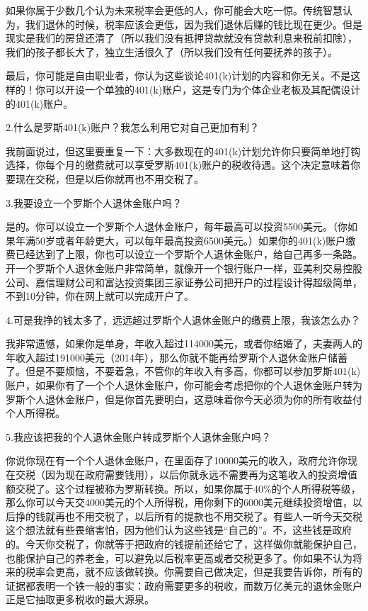 如果你属于少数几个认为未来税率会更低的人，你可能会大吃一惊。传统智慧认为，我们退休的时候，税率应该会更低，因为我们退休后赚的钱比现在更少。但是现实是我们的房贷还清了（所以我们没有抵押贷款就没有贷款利息来税前扣除），我们的孩子都长大了，独立生活很久了（所以我们没有任何要抚养的孩子）。

最后，你可能是自由职业者，你认为这些谈论401(k)计划的内容和你无关。不是这样的！你可以开设一个单独的401(k)账户，这是专门为个体企业老板及其配偶设计的401(k)账户。

2.什么是罗斯401(k)账户？我怎么利用它对自己更加有利？

我前面说过，但这里要重复一下：大多数现在的401(k)计划允许你只要简单地打钩选择，你每个月的缴费就可以享受罗斯401(k)账户的税收待遇。这个决定意味着你要现在交税，但是以后你就再也不用交税了。

3.我要设立一个罗斯个人退休金账户吗？

是的。你可以设立一个罗斯个人退休金账户，每年最高可以投资5500美元。（你如果年满50岁或者年龄更大，可以每年最高投资6500美元。）如果你的401(k)账户缴费已经达到了上限，你也可以设立一个罗斯个人退休金账户，给自己再多一条路。开一个罗斯个人退休金账户非常简单，就像开一个银行账户一样，亚美利交易控股公司、嘉信理财公司和富达投资集团三家证券公司把开户的过程设计得超级简单，不到10分钟，你在网上就可以完成开户了。

4.可是我挣的钱太多了，远远超过罗斯个人退休金账户的缴费上限，我该怎么办？

我非常遗憾，如果你是单身，年收入超过114000美元，或者你结婚了，夫妻两人的年收入超过191000美元（2014年），那么你就不能再给罗斯个人退休金账户储蓄了。但是不要烦恼，不要着急，不管你的年收入有多高，你都可以参加罗斯401(k)账户，如果你有了一个个人退休金账户，你可能会考虑把你的个人退休金账户转为罗斯个人退休金账户，但是你首先要明白，这意味着你今天必须为你的所有收益付个人所得税。

5.我应该把我的个人退休金账户转成罗斯个人退休金账户吗？

你说你现在有一个个人退休金账户，在里面存了10000美元的收入，政府允许你现在交税（因为现在政府需要钱用），以后你就永远不需要再为这笔收入的投资增值额交税了。这个过程被称为罗斯转换。所以，如果你属于40\%的个人所得税等级，那么你可以今天交4000美元的个人所得税，用你剩下的6000美元继续投资增值，以后挣的钱就再也不用交税了，以后所有的提款也不用交税了。有些人一听今天交税这个想法就有些畏缩害怕，因为他们认为这些钱是“自己的”。不，这些钱是政府的。今天你交税了，你就等于把政府的钱提前还给它了，这样做你就能保护自己，也能保护自己的养老金，可以避免以后税率更高或者交税更多了。你如果不认为将来的税率会更高，就不应该做转换。你需要自己做决定，但是我要告诉你，所有的证据都表明一个铁一般的事实：政府需要更多的税收，而数万亿美元的退休金账户正是它抽取更多税收的最大源泉。

